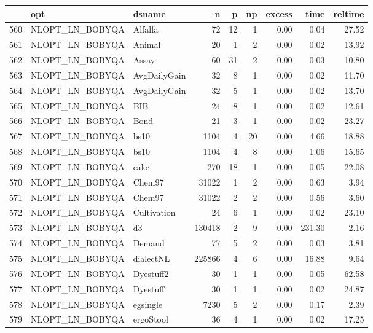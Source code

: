 \documentclass[article]{jss}
\begin{document}
\begin{table}[htbp]
\centering
\begin{tabular}{rllrrrrrr}
  \hline
 & opt & dsname & n & p & np & excess & time & reltime \\ 
  \hline
560 & NLOPT\_LN\_BOBYQA & Alfalfa &  72 &  12 &   1 & 0.00 & 0.04 & 27.52 \\ 
  561 & NLOPT\_LN\_BOBYQA & Animal &  20 &   1 &   2 & 0.00 & 0.02 & 13.92 \\ 
  562 & NLOPT\_LN\_BOBYQA & Assay &  60 &  31 &   2 & 0.00 & 0.03 & 10.80 \\ 
  563 & NLOPT\_LN\_BOBYQA & AvgDailyGain &  32 &   8 &   1 & 0.00 & 0.02 & 11.70 \\ 
  564 & NLOPT\_LN\_BOBYQA & AvgDailyGain &  32 &   5 &   1 & 0.00 & 0.02 & 13.70 \\ 
  565 & NLOPT\_LN\_BOBYQA & BIB &  24 &   8 &   1 & 0.00 & 0.02 & 12.61 \\ 
  566 & NLOPT\_LN\_BOBYQA & Bond &  21 &   3 &   1 & 0.00 & 0.02 & 23.27 \\ 
  567 & NLOPT\_LN\_BOBYQA & bs10 & 1104 &   4 &  20 & 0.00 & 4.66 & 18.88 \\ 
  568 & NLOPT\_LN\_BOBYQA & bs10 & 1104 &   4 &   8 & 0.00 & 1.06 & 15.65 \\ 
  569 & NLOPT\_LN\_BOBYQA & cake & 270 &  18 &   1 & 0.00 & 0.05 & 22.08 \\ 
  570 & NLOPT\_LN\_BOBYQA & Chem97 & 31022 &   1 &   2 & 0.00 & 0.63 & 3.94 \\ 
  571 & NLOPT\_LN\_BOBYQA & Chem97 & 31022 &   2 &   2 & 0.00 & 0.56 & 3.60 \\ 
  572 & NLOPT\_LN\_BOBYQA & Cultivation &  24 &   6 &   1 & 0.00 & 0.02 & 23.10 \\ 
  573 & NLOPT\_LN\_BOBYQA & d3 & 130418 &   2 &   9 & 0.00 & 231.30 & 2.16 \\ 
  574 & NLOPT\_LN\_BOBYQA & Demand &  77 &   5 &   2 & 0.00 & 0.03 & 3.81 \\ 
  575 & NLOPT\_LN\_BOBYQA & dialectNL & 225866 &   4 &   6 & 0.00 & 16.88 & 9.64 \\ 
  576 & NLOPT\_LN\_BOBYQA & Dyestuff2 &  30 &   1 &   1 & 0.00 & 0.05 & 62.58 \\ 
  577 & NLOPT\_LN\_BOBYQA & Dyestuff &  30 &   1 &   1 & 0.00 & 0.02 & 24.87 \\ 
  578 & NLOPT\_LN\_BOBYQA & egsingle & 7230 &   5 &   2 & 0.00 & 0.17 & 2.39 \\ 
  579 & NLOPT\_LN\_BOBYQA & ergoStool &  36 &   4 &   1 & 0.00 & 0.02 & 17.25 \\ 

\end{tabular}
\end{table}
\end{document}
